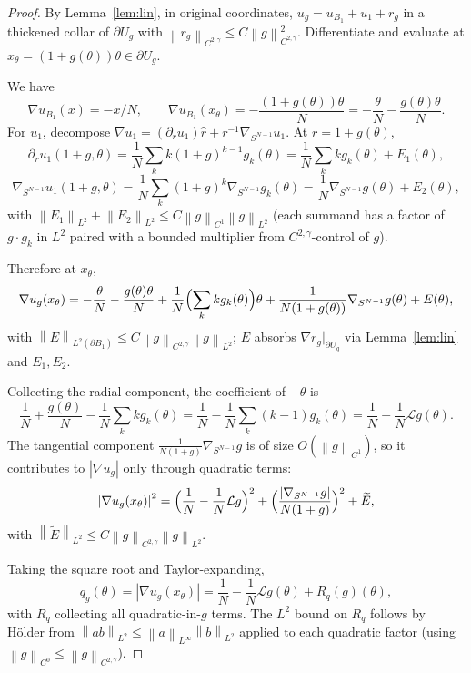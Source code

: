 \documentclass[11pt]{article}
\theoremstyle{definition}
\newcommand{\norm}[1]{\left\|#1\right\|}
\newcommand{\abs}[1]{\left|#1\right|}
\begin{document}
\begin{proof}
By Lemma~\ref{lem:lin}, in original coordinates,
$u_g=u_{B_1}+u_1+r_g$ in a thickened collar of $\partial U_g$ with
$\norm{r_g}_{C^{2,\gamma}}\le C\norm{g}_{C^{2,\gamma}}^2$. Differentiate and
evaluate at $x_\theta=(1+g(\theta))\theta\in\partial U_g$.

We have
\[
\nabla u_{B_1}(x)=-x/N,\qquad
\nabla u_{B_1}(x_\theta)=-\frac{(1+g(\theta))\theta}{N}=-\frac{\theta}{N}-\frac{g(\theta)\theta}{N}.
\]
For $u_1$, decompose $\nabla u_1=(\partial_r u_1)\hat r
+r^{-1}\nabla_{S^{N-1}}u_1$. At $r=1+g(\theta)$,
\[
\partial_r u_1(1+g,\theta)
=\frac{1}{N}\sum_k k(1+g)^{k-1}g_k(\theta)
=\frac{1}{N}\sum_k k g_k(\theta)+E_1(\theta),
\]
\[
\nabla_{S^{N-1}}u_1(1+g,\theta)
=\frac{1}{N}\sum_k (1+g)^k\nabla_{S^{N-1}}g_k(\theta)
=\frac{1}{N}\nabla_{S^{N-1}}g(\theta)+E_2(\theta),
\]
with $\norm{E_1}_{L^2}+\norm{E_2}_{L^2}\le C\norm{g}_{C^1}\norm{g}_{L^2}$
(each summand has a factor of $g\cdot g_k$ in $L^2$ paired with a bounded
multiplier from $C^{2,\gamma}$-control of $g$).

Therefore at $x_\theta$,
\[
\nabla u_g(x_\theta)
=
-\frac{\theta}{N}-\frac{g(\theta)\theta}{N}
+\frac{1}{N}\Bigl(\sum_k k g_k(\theta)\Bigr)\theta
+\frac{1}{N(1+g(\theta))}\nabla_{S^{N-1}}g(\theta)
+E(\theta),
\]
with $\norm{E}_{L^2(\partial B_1)}\le C\norm{g}_{C^{2,\gamma}}\norm{g}_{L^2}$;
$E$ absorbs $\nabla r_g\big|_{\partial U_g}$ via Lemma~\ref{lem:lin} and
$E_1,E_2$.

Collecting the radial component, the coefficient of $-\theta$ is
\[
\frac{1}{N}+\frac{g(\theta)}{N}-\frac{1}{N}\sum_k kg_k(\theta)
=\frac{1}{N}-\frac{1}{N}\sum_k(k-1)g_k(\theta)
=\frac{1}{N}-\frac{1}{N}\mathcal L g(\theta).
\]
The tangential component $\frac{1}{N(1+g)}\nabla_{S^{N-1}}g$ is of size
$O(\norm{g}_{C^1})$, so it contributes to $\abs{\nabla u_g}$ only through
quadratic terms:
\[
\abs{\nabla u_g(x_\theta)}^2
=\Bigl(\frac{1}{N}-\frac{1}{N}\mathcal L g\Bigr)^2
+\Bigl(\frac{\abs{\nabla_{S^{N-1}}g}}{N(1+g)}\Bigr)^2
+\widetilde E,
\]
with $\norm{\widetilde E}_{L^2}\le C\norm{g}_{C^{2,\gamma}}\norm{g}_{L^2}$.

Taking the square root and Taylor-expanding,
\[
q_g(\theta)=\abs{\nabla u_g(x_\theta)}
=\frac{1}{N}-\frac{1}{N}\mathcal L g(\theta)+R_q(g)(\theta),
\]
with $R_q$ collecting all quadratic-in-$g$ terms. The $L^2$ bound on $R_q$
follows by H\"older from $\norm{ab}_{L^2}\le\norm{a}_{L^\infty}\norm{b}_{L^2}$
applied to each quadratic factor (using $\norm{g}_{C^0}\le\norm{g}_{C^{2,\gamma}}$).
\end{proof}
\end{document}
